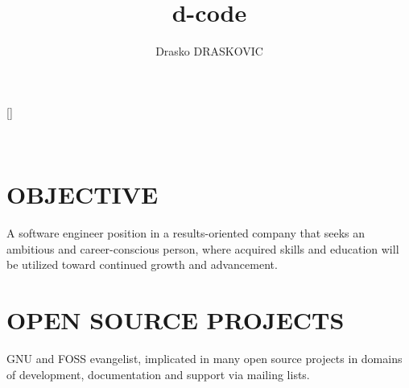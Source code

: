 \documentclass[a4paper, oneside, final]{scrartcl}
\title{d-code}
\author{Drasko DRASKOVIC}
\begin{document}

\titleformat{\section}{\large\scshape\raggedright}{}{0em}{}[\titlerule]

\begin{center}

   \textsc{\huge{}}

   \\

\end{center}

\section{OBJECTIVE}
   A software engineer position in a results-oriented company that seeks an
   ambitious and career-conscious person, where acquired skills and education
   will be utilized toward continued growth and advancement.


\section{OPEN SOURCE PROJECTS}
GNU and FOSS evangelist, implicated in many open source projects in domains of
development, documentation and support via mailing lists.
\end{document}
